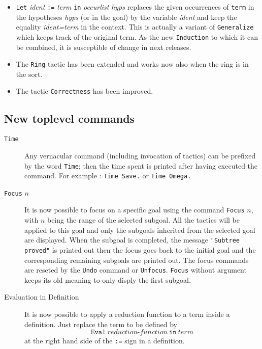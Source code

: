 \documentclass[11pt]{article}
\begin{document}
\begin{itemize}
 \item \texttt{Let} \textit{ident} \texttt{:=} \textit{term}
 \texttt{in} \textit{occurlist} \textit{hyps} replaces the given
 occurrences of \texttt{term} in the hypotheses \textit{hyps} (or in
 the goal) by the variable \textit{ident} and keep the equality
 \textit{ident=term} in the context. This is actually a variant of
 \texttt{Generalize} which keeps track of the original term. As the
 new \texttt{Induction} to which it can be combined, it is susceptible
 of change in next releases.

 \item The \texttt{Ring} tactic has been extended and 
   works now also when the ring is in the \Type{} sort.

  \item The tactic \texttt{Correctness} has been improved.
  \end{itemize}

\subsection{New toplevel commands}

\begin{description}
    
\item[\texttt{Time}] Any vernacular command (including invocation of
    tactics) can be prefixed by the word \texttt{Time}; then the time
    spent is printed after having executed the command. For example :
    \texttt{Time Save.} or \texttt{Time Omega.}
    
\item[\texttt{Focus} $n$] It is now possible to focus on a specific
    goal using the command \texttt{Focus} $n$, with $n$ being the
    range of the selected subgoal. All the tactics will be applied to
    this goal and only the subgoals inherited from the selected goal
    are displayed.  When the subgoal is completed, the message
    \texttt{"Subtree proved"} is printed out then the focus goes back
    to the initial goal and the corresponding remaining subgoals are
    printed out.  The focus commands are reseted by the
    \texttt{Undo} command or \texttt{Unfocus}.  \texttt{Focus}
    without argument keeps its old meaning to only disply the first
    subgoal.

\item[Evaluation in Definition] It is now possible to apply a
  reduction function to a term inside a definition. Just replace the
  term to be defined by 
  \[ \texttt{Eval}~ \textit{reduction-function}~ \texttt{in}~
  \textit{term}\] 
  at the right hand side of the \texttt{:=} sign in a definition.

  \end{description}
\end{document}
